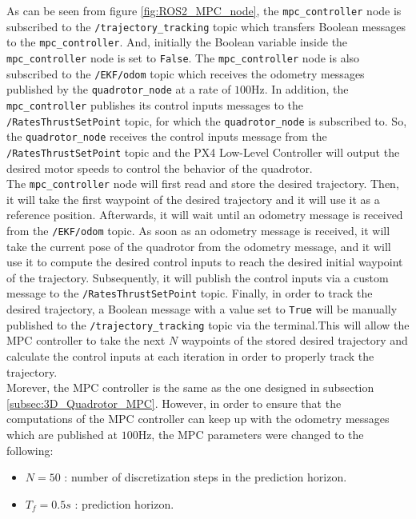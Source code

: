 \documentclass{thesisreport}
\begin{document}
As can be seen from figure \ref{fig:ROS2_MPC_node}, the \texttt{mpc\_controller} node is subscribed to the \texttt{/trajectory\_tracking} topic which transfers Boolean messages to the \texttt{mpc\_controller}. And, initially the Boolean variable inside the \texttt{mpc\_controller} node is set to \texttt{False}. The \texttt{mpc\_controller} node is also subscribed to the \texttt{/EKF/odom} topic which receives the odometry messages published by the \texttt{quadrotor\_node} at a rate of $100$Hz. In addition, the \texttt{mpc\_controller} publishes its control inputs messages to the \texttt{/RatesThrustSetPoint} topic, for which the \texttt{quadrotor\_node} is subscribed to. So, the \texttt{quadrotor\_node} receives the control inputs message from the \texttt{/RatesThrustSetPoint} topic and the PX4 Low-Level Controller will output the desired motor speeds to control the behavior of the quadrotor. \\

The \texttt{mpc\_controller} node will first read and store the desired trajectory. Then, it will take the first waypoint of the desired trajectory and it will use it as a reference position. Afterwards, it will wait until an odometry message is received from the \texttt{/EKF/odom} topic. As soon as an odometry message is received, it will take the current pose of the quadrotor from the odometry message, and it will use it to compute the desired control inputs to reach the desired initial waypoint of the trajectory. Subsequently, it will publish the control inputs via a custom message to the \texttt{/RatesThrustSetPoint} topic. Finally, in order to track the desired trajectory, a Boolean message with a value set to \texttt{True} will be manually published to the \texttt{/trajectory\_tracking} topic via the terminal.This will allow the MPC controller to take the next $N$ waypoints of the stored desired trajectory and calculate the control inputs at each iteration in order to properly track the trajectory. \\ 

Morever, the MPC controller is the same as the one designed in subsection \ref{subsec:3D_Quadrotor_MPC}. However, in order to ensure that the computations of the MPC controller can keep up with the odometry messages which are published at $100$Hz, the  MPC parameters were changed to the following:

\begin{itemize}
	\item $N = 50$ : number of discretization steps in the prediction horizon.
	\item $T_f = 0.5s$ : prediction horizon.
\end{itemize}
\end{document}
